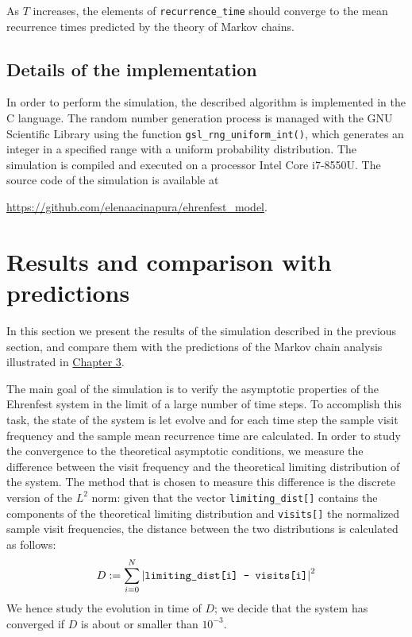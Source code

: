 As $T$ increases, the elements of \texttt{recurrence\_time} should converge to the mean recurrence times predicted by the theory of Markov chains.

\subsection{Details of the implementation}
In order to perform the simulation, the described algorithm is implemented in the C language. The random number generation process is managed with the GNU Scientific Library using the function \texttt{gsl\_rng\_uniform\_int()}, which generates an integer in a specified range with a uniform probability distribution. The simulation is compiled and executed on a processor Intel Core i7-8550U. The source code of the simulation is available at 
\begin{center}
\url{https://github.com/elenaacinapura/ehrenfest_model}.
\end{center}

\section{Results and comparison with predictions}
In this section we present the results of the simulation described in the previous section, and compare them with the predictions of the Markov chain analysis illustrated in \hyperref[ch:3]{Chapter 3}.

The main goal of the simulation is to verify the asymptotic properties of the Ehrenfest system in the limit of a large number of time steps. To accomplish this task, the state of the system is let evolve and for each time step the sample visit frequency and the sample mean recurrence time are calculated. In order to study the convergence to the theoretical asymptotic conditions, we measure the difference between the visit frequency and the theoretical limiting distribution of the system. The method that is chosen to measure this difference is the discrete version of the $L^2$ norm: given that the vector \texttt{limiting\_dist[]} contains the components of the theoretical limiting distribution and \texttt{visits[]} the normalized sample visit frequencies, the distance between the two distributions is calculated as follows:
\begin{equation} \label{eq:distance}
    D := \sum_{i = 0}^{N} \left|\text{\texttt{limiting\_dist[i] - visits[i]}} \right| ^2
\end{equation}
We hence study the evolution in time of $D$; we decide that the system has converged if $D$ is about or smaller than $10^{-3}$.


